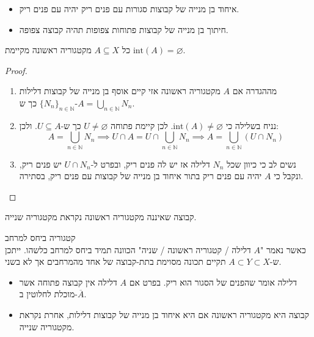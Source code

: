 \documentclass{tstextbook}
\begin{document}
\begin{lemma}
  \begin{itemize}
    \item איחוד בן מנייה של קבוצות סגורות עם פנים ריק יהיה עם פנים ריק.
    \item חיתוך בן מנייה של קבוצות פתוחות צפופות תהיה קבוצה צפופה.
  \end{itemize}
\end{lemma}
\begin{proposition}
כל \(A\subseteq X\) מקטגוריה ראשונה מקיימת \(\text{int}(A)=\varnothing\).

\end{proposition}
\begin{proof}
  \begin{enumerate}
    \item מההגדרה אם \(A\) מקטגוריה ראשונה אזי קיים אוסף בן מנייה של קבוצות דלילות \(\{ N_{n} \}_{n \in \mathbb{N}}\) כך ש-\(A=\bigcup_{n \in \mathbb{N}}N_{n}\).  


    \item נניח בשלילה כי \(\text{int}(A)\neq \varnothing\). לכן קיימת פתוחה \(U\neq \varnothing\) כך ש-\(U\subseteq A\). ולכן: 
$$A=\bigcup_{n \in \mathbb{N}}N_{n}\implies U\cap A=U\cap\bigcup_{n \in \mathbb{N}}N_{n}\implies A=\bigcup_{n \in \mathbb{N}}\left( U\cap N_{n} \right)$$


    \item נשים לב כי כיוון שכל \(N_{n}\) דלילה אז יש לה פנים ריק, ובפרט ל-\(U\cap N_{n}\) יש פנים ריק, ונקבל כי \(A\) יהיה עם פנים ריק בתור איחוד בן מנייה של קבוצות עם פנים ריק, בסתירה.  


  \end{enumerate}
\end{proof}
\begin{definition}
קבוצה שאיננה מקטגוריה ראשונה נקראת מקטגוריה שנייה.

\end{definition}
\begin{remark}
קטגוריה ביחס למרחב\\

כאשר נאמר "\(A\) דלילה / קטגוריה ראשונה / שניה" הכוונה תמיד ביחס למרחב כלשהו. 
ייתכן ש-\(A\subset Y\subset X\) תקיים תכונה מסוימת בתת-קבוצה של אחד מהמרחבים אך לא בשני.

\end{remark}
\begin{summary}
  \begin{itemize}
    \item דלילה אומר שהפנים של הסגור הוא ריק. בפרט אם \(A\) דלילה אין קבוצה פתוחה אשר מוכלת לחלוטין ב-\(\overline{A}\).
    \item קבוצה היא מקטגוריה ראשונה אם היא איחוד בן מנייה של קבוצות דלילות, אחרת נקראת מקטגוריה שנייה.
  \end{itemize}
\end{summary}
\end{document}
